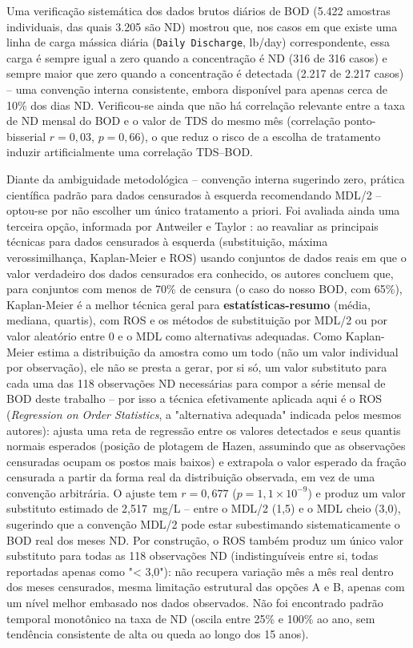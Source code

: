 Uma verificação sistemática dos dados brutos diários de BOD (5.422 amostras individuais, das quais 3.205 são ND) mostrou que, nos casos em que existe uma linha de carga mássica diária (\texttt{Daily Discharge}, lb/day) correspondente, essa carga é sempre igual a zero quando a concentração é ND (316 de 316 casos) e sempre maior que zero quando a concentração é detectada (2.217 de 2.217 casos) -- uma convenção interna consistente, embora disponível para apenas cerca de 10\% dos dias ND. Verificou-se ainda que não há correlação relevante entre a taxa de ND mensal do BOD e o valor de TDS do mesmo mês (correlação ponto-bisserial $r = 0{,}03$, $p = 0{,}66$), o que reduz o risco de a escolha de tratamento induzir artificialmente uma correlação TDS--BOD.

Diante da ambiguidade metodológica -- convenção interna sugerindo zero, prática científica padrão para dados censurados à esquerda recomendando MDL/2 -- optou-se por não escolher um único tratamento a priori. Foi avaliada ainda uma terceira opção, informada por Antweiler e Taylor \cite{antweiler2008evaluation}: ao reavaliar as principais técnicas para dados censurados à esquerda (substituição, máxima verossimilhança, Kaplan-Meier e ROS) usando conjuntos de dados reais em que o valor verdadeiro dos dados censurados era conhecido, os autores concluem que, para conjuntos com menos de 70\% de censura (o caso do nosso BOD, com 65\%), Kaplan-Meier é a melhor técnica geral para \textbf{estatísticas-resumo} (média, mediana, quartis), com ROS e os métodos de substituição por MDL/2 ou por valor aleatório entre 0 e o MDL como alternativas adequadas. Como Kaplan-Meier estima a distribuição da amostra como um todo (não um valor individual por observação), ele não se presta a gerar, por si só, um valor substituto para cada uma das 118 observações ND necessárias para compor a série mensal de BOD deste trabalho -- por isso a técnica efetivamente aplicada aqui é o ROS (\textit{Regression on Order Statistics}, a "alternativa adequada" indicada pelos mesmos autores): ajusta uma reta de regressão entre os valores detectados e seus quantis normais esperados (posição de plotagem de Hazen, assumindo que as observações censuradas ocupam os postos mais baixos) e extrapola o valor esperado da fração censurada a partir da forma real da distribuição observada, em vez de uma convenção arbitrária. O ajuste tem $r=0{,}677$ ($p=1{,}1\times10^{-9}$) e produz um valor substituto estimado de 2,517~mg/L -- entre o MDL/2 (1,5) e o MDL cheio (3,0), sugerindo que a convenção MDL/2 pode estar subestimando sistematicamente o BOD real dos meses ND. Por construção, o ROS também produz um único valor substituto para todas as 118 observações ND (indistinguíveis entre si, todas reportadas apenas como "< 3,0"): não recupera variação mês a mês real dentro dos meses censurados, mesma limitação estrutural das opções A e B, apenas com um nível melhor embasado nos dados observados. Não foi encontrado padrão temporal monotônico na taxa de ND (oscila entre 25\% e 100\% ao ano, sem tendência consistente de alta ou queda ao longo dos 15 anos).

